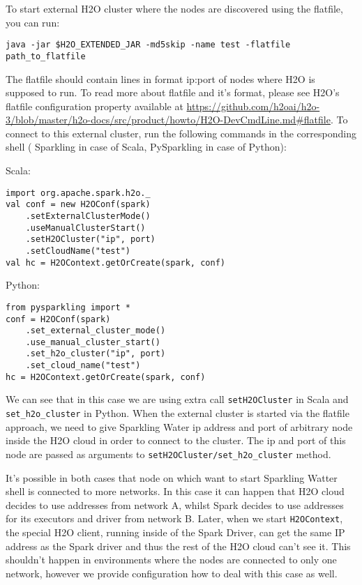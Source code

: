To start external H2O cluster where the nodes are discovered using the flatfile, you can run:

\begin{lstlisting}[style=bash]
java -jar $H2O_EXTENDED_JAR -md5skip -name test -flatfile path_to_flatfile
\end{lstlisting}

The flatfile should contain lines in format ip:port of nodes where H2O is supposed to run. To read more about flatfile and it's format, please see H2O's flatfile configuration property available at \url{https://github.com/h2oai/h2o-3/blob/master/h2o-docs/src/product/howto/H2O-DevCmdLine.md#flatfile}.
To connect to this external cluster, run the following commands in the corresponding shell ( Sparkling in case of Scala, PySparkling in case of Python):

Scala:
\begin{lstlisting}[style=Scala]
import org.apache.spark.h2o._
val conf = new H2OConf(spark)
    .setExternalClusterMode()
    .useManualClusterStart()
    .setH2OCluster("ip", port)
    .setCloudName("test")
val hc = H2OContext.getOrCreate(spark, conf)
\end{lstlisting}

Python:
\begin{lstlisting}[style=Python]
from pysparkling import *
conf = H2OConf(spark)
    .set_external_cluster_mode()
    .use_manual_cluster_start()
    .set_h2o_cluster("ip", port)
    .set_cloud_name("test")
hc = H2OContext.getOrCreate(spark, conf)
\end{lstlisting}

We can see that in this case we are using extra call \texttt{setH2OCluster} in Scala and \texttt{set\_h2o\_cluster} in Python. When the external cluster is started via the flatfile approach, we need to give Sparkling Water ip address and port of arbitrary node inside the H2O cloud in order to connect to the cluster. The ip and port of this node are passed as arguments to \texttt{setH2OCluster/set\_h2o\_cluster} method.

It's possible in both cases that node on which want to start Sparkling Watter shell is connected to more networks. In this case it can happen that H2O cloud decides to use addresses from network A, whilst Spark decides to use addresses for its executors and driver from network B. Later, when we start \texttt{H2OContext}, the special H2O client, running inside of the Spark Driver, can get the same IP address as the Spark driver and thus the rest of the H2O cloud can't see it. This shouldn't happen in environments where the nodes are connected to only one network, however we provide configuration how to deal with this case as well.

